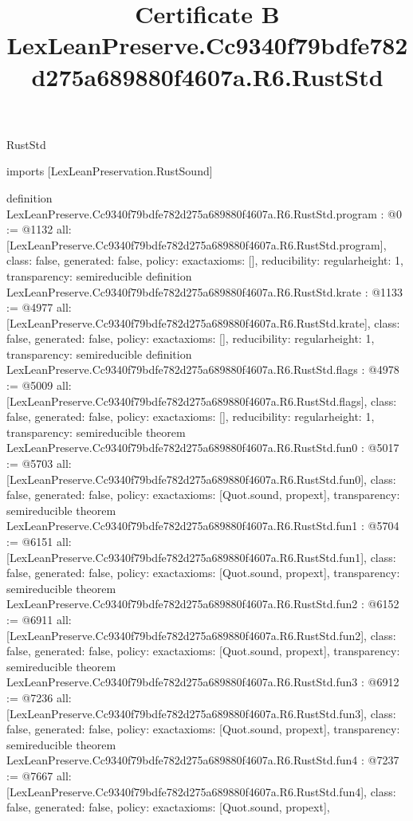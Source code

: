 \begin{lexlean}{RustStd}
\title{Certificate B LexLeanPreserve.Cc9340f79bdfe782d275a689880f4607a.R6.RustStd}
\begin{coremodule}
imports [LexLeanPreservation.RustSound]

definition LexLeanPreserve.Cc9340f79bdfe782d275a689880f4607a.R6.RustStd.program : @0 := @1132 {
  all: [LexLeanPreserve.Cc9340f79bdfe782d275a689880f4607a.R6.RustStd.program],
  class: false,
  generated: false,
  policy: exact{axioms: []},
  reducibility: regular{height: 1},
  transparency: semireducible
}
definition LexLeanPreserve.Cc9340f79bdfe782d275a689880f4607a.R6.RustStd.krate : @1133 := @4977 {
  all: [LexLeanPreserve.Cc9340f79bdfe782d275a689880f4607a.R6.RustStd.krate],
  class: false,
  generated: false,
  policy: exact{axioms: []},
  reducibility: regular{height: 1},
  transparency: semireducible
}
definition LexLeanPreserve.Cc9340f79bdfe782d275a689880f4607a.R6.RustStd.flags : @4978 := @5009 {
  all: [LexLeanPreserve.Cc9340f79bdfe782d275a689880f4607a.R6.RustStd.flags],
  class: false,
  generated: false,
  policy: exact{axioms: []},
  reducibility: regular{height: 1},
  transparency: semireducible
}
theorem LexLeanPreserve.Cc9340f79bdfe782d275a689880f4607a.R6.RustStd.fun0 : @5017 := @5703 {
  all: [LexLeanPreserve.Cc9340f79bdfe782d275a689880f4607a.R6.RustStd.fun0],
  class: false,
  generated: false,
  policy: exact{axioms: [Quot.sound, propext]},
  transparency: semireducible
}
theorem LexLeanPreserve.Cc9340f79bdfe782d275a689880f4607a.R6.RustStd.fun1 : @5704 := @6151 {
  all: [LexLeanPreserve.Cc9340f79bdfe782d275a689880f4607a.R6.RustStd.fun1],
  class: false,
  generated: false,
  policy: exact{axioms: [Quot.sound, propext]},
  transparency: semireducible
}
theorem LexLeanPreserve.Cc9340f79bdfe782d275a689880f4607a.R6.RustStd.fun2 : @6152 := @6911 {
  all: [LexLeanPreserve.Cc9340f79bdfe782d275a689880f4607a.R6.RustStd.fun2],
  class: false,
  generated: false,
  policy: exact{axioms: [Quot.sound, propext]},
  transparency: semireducible
}
theorem LexLeanPreserve.Cc9340f79bdfe782d275a689880f4607a.R6.RustStd.fun3 : @6912 := @7236 {
  all: [LexLeanPreserve.Cc9340f79bdfe782d275a689880f4607a.R6.RustStd.fun3],
  class: false,
  generated: false,
  policy: exact{axioms: [Quot.sound, propext]},
  transparency: semireducible
}
theorem LexLeanPreserve.Cc9340f79bdfe782d275a689880f4607a.R6.RustStd.fun4 : @7237 := @7667 {
  all: [LexLeanPreserve.Cc9340f79bdfe782d275a689880f4607a.R6.RustStd.fun4],
  class: false,
  generated: false,
  policy: exact{axioms: [Quot.sound, propext]},
}
\end{coremodule}
\end{lexlean}
